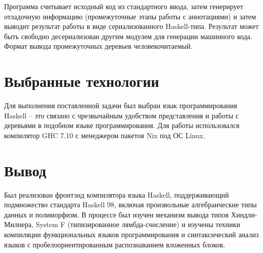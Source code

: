 \documentclass[a4paper,12pt]{article}
\begin{document}
Программа считывает исходный код из стандартного ввода, затем генерирует
отладочную информацию (промежуточные этапы работы с аннотациями) и затем выводит
результат работы в виде сериализованного Haskell-типа. Результат может быть
свободно десериализован другим модулем для генерации машинного кода. Формат
вывода промежуточных деревьев человекочитаемый.

\section{Выбранные технологии}

Для выполнения поставленной задачи был выбран язык программирования Haskell --
это связано с чрезвычайным удобством представления и работы с деревьями в
подобном языке программирования. Для работы использовался компилятор GHC 7.10 с
менеджером пакетов Nix под ОС Linux.

\section{Вывод}

Был реализован фронтэнд компилятора языка Haskell, поддерживающий подмножество
стандарта Haskell 98, включая произвольные алгебраические типы данных и
полиморфизм. В процессе был изучен механизм вывода типов Хиндли-Милнера, System
F (типизированное лямбда-счисление) и изучены техники компиляции функциональных
языков программирования и синтаксический анализ языков с пробелоориентированным
распознаванием вложенных блоков.

\printbibliography[heading=bibintoc]
\end{document}

